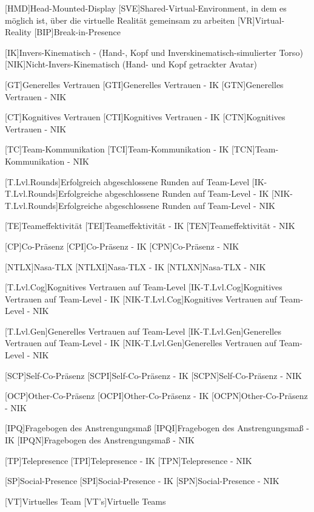 \begin{acronym}
	[HMD]{Head-Mounted-Display}
	[SVE]{Shared-Virtual-Environment, in dem es möglich ist, über die virtuelle Realität gemeinsam zu arbeiten}
	[VR]{Virtual-Reality}
	[BIP]{Break-in-Presence}
	
	[IK]{Invers-Kinematisch - (Hand-, Kopf und Inverskinematisch-simulierter Torso)}
	[NIK]{Nicht-Invers-Kinematisch (Hand- und Kopf getrackter Avatar)}
	
	[GT]{Generelles Vertrauen}
	[GTI]{Generelles Vertrauen - IK}
	[GTN]{Generelles Vertrauen - NIK}
	
	[CT]{Kognitives Vertrauen}
	[CTI]{Kognitives Vertrauen - IK}
	[CTN]{Kognitives Vertrauen - NIK}
	
	[TC]{Team-Kommunikation}
	[TCI]{Team-Kommunikation - IK}
	[TCN]{Team-Kommunikation - NIK}
	
	[T.Lvl.Rounds]{Erfolgreich abgeschlossene Runden auf Team-Level}
	[IK-T.Lvl.Rounds]{Erfolgreiche abgeschlossene Runden auf Team-Level - IK}
	[NIK-T.Lvl.Rounds]{Erfolgreiche abgeschlossene Runden auf Team-Level - NIK}
	
	[TE]{Teameffektivität}
	[TEI]{Teameffektivität - IK}
	[TEN]{Teameffektivität - NIK}
	
	[CP]{Co-Präsenz}
	[CPI]{Co-Präsenz - IK}
	[CPN]{Co-Präsenz - NIK}
	
	[NTLX]{Nasa-TLX}
	[NTLXI]{Nasa-TLX - IK}
	[NTLXN]{Nasa-TLX - NIK}
	
	[T.Lvl.Cog]{Kognitives Vertrauen auf Team-Level}
	[IK-T.Lvl.Cog]{Kognitives Vertrauen auf Team-Level - IK}
	[NIK-T.Lvl.Cog]{Kognitives Vertrauen auf Team-Level - NIK}
	
	[T.Lvl.Gen]{Generelles Vertrauen auf Team-Level}
	[IK-T.Lvl.Gen]{Generelles Vertrauen auf Team-Level - IK}
	[NIK-T.Lvl.Gen]{Generelles Vertrauen auf Team-Level - NIK}
	
	[SCP]{Self-Co-Präsenz}
	[SCPI]{Self-Co-Präsenz - IK}
	[SCPN]{Self-Co-Präsenz - NIK}	
	
	[OCP]{Other-Co-Präsenz}
	[OCPI]{Other-Co-Präsenz - IK}
	[OCPN]{Other-Co-Präsenz - NIK}	
	
	[IPQ]{Fragebogen des Anstrengungsmaß}
	[IPQI]{Fragebogen des Anstrengungsmaß - IK}
	[IPQN]{Fragebogen des Anstrengungsmaß - NIK}
	
	[TP]{Telepresence}
	[TPI]{Telepresence - IK}
	[TPN]{Telepresence - NIK}	
	
	[SP]{Social-Presence}
	[SPI]{Social-Presence - IK}
	[SPN]{Social-Presence - NIK}
	
	[VT]{Virtuelles Team}
	[VT's]{Virtuelle Teams}
\end{acronym}
